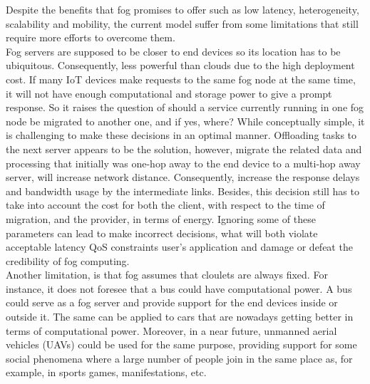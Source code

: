 \noindent\tab Despite the benefits that fog promises to offer such as low latency, heterogeneity, scalability and mobility, the current model suffer from some limitations that still require more efforts to overcome them.\\
\noindent\tab Fog servers are supposed to be closer to end devices so its location has to be ubiquitous. Consequently, less powerful than clouds due to the high deployment cost. If many IoT devices make requests to the same fog node at the same time, it will not have enough computational and storage power to give a prompt response. So it raises the question of should a service currently running in one fog node be migrated to another one, and if yes, where? While conceptually simple, it is challenging to make these decisions in an optimal manner. Offloading tasks to the next server appears to be the solution, however, migrate the related data and processing that initially was one-hop away to the end device to a multi-hop away server, will increase network distance. Consequently, increase the response delays and bandwidth usage by the intermediate links. Besides, this decision still has to take into account the cost for both the client, with respect to the time of migration, and the provider, in terms of energy. Ignoring some of these parameters can lead to make incorrect decisions, what will both violate acceptable latency QoS constraints user's application and damage or defeat the credibility of fog computing.\\
\noindent\tab Another limitation, is that fog assumes that cloulets are always fixed. For instance, it does not foresee that a bus could have computational power. A bus could serve as a fog server and provide support for the end devices inside or outside it. The same can be applied to cars that are nowadays getting better in terms of computational power. Moreover, in a near future, unmanned aerial vehicles (UAVs) could be used for the same purpose, providing support for some social phenomena where a large number of people join in the same place as, for example, in sports games, manifestations, etc.\\
